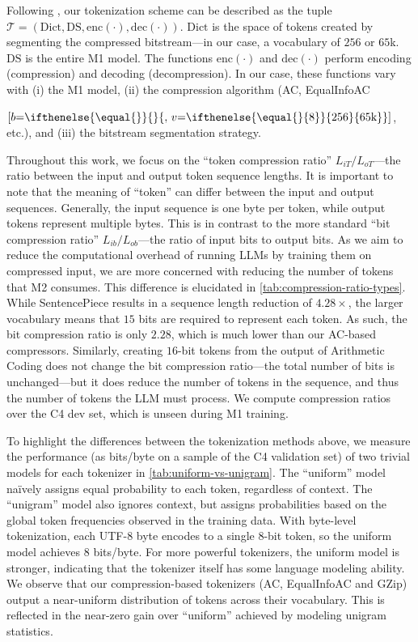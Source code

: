 Following \citet{rajaramanTowardTheoryTokenization2024}, our tokenization scheme can be described as the tuple $\mathcal{T} = (\mathrm{Dict}, \mathrm{DS}, \mathrm{enc}(\cdot), \mathrm{dec}(\cdot))$. $\mathrm{Dict}$ is the space of tokens created by segmenting the compressed bitstream---in our case, a vocabulary of $256$ or $65$k. $\mathrm{DS}$ is the entire M1 model. The functions $\mathrm{enc}(\cdot)$ and $\mathrm{dec}(\cdot)$ perform encoding (compression) and decoding (decompression). In our case, these functions vary with (i) the M1 model, (ii) the compression algorithm (AC{}, EqualInfoAC
\ifthenelse{
    \equal{} \AND \equal{}
  }

  {$[b\mathord{=}\ifthenelse{\equal{}}{}{,\,v\mathord{=}\ifthenelse{\equal{}{8}}{256}{65\text{k}}}]$}, etc.), and (iii) the bitstream segmentation strategy.

Throughout this work, we focus on the ``token compression ratio'' $L_{iT}/L_{oT}$---the ratio between the input and output token sequence lengths. It is important to note that the meaning of ``token'' can differ between the input and output sequences. Generally, the input sequence is one byte per token, while output tokens represent multiple bytes. This is in contrast to the more standard ``bit compression ratio'' $L_{ib}/L_{ob}$---the ratio of input bits to output bits. As we aim to reduce the computational overhead of running LLMs by training them on compressed input, we are more concerned with reducing the number of tokens that M2 consumes. This difference is elucidated in \ref{tab:compression-ratio-types}. While SentencePiece results in a sequence length reduction of $4.28\times$, the larger vocabulary means that $15$ bits are required to represent each token. As such, the bit compression ratio is only $2.28$, which is much lower than our AC-based compressors. Similarly, creating $16$-bit tokens from the output of Arithmetic Coding does not change the bit compression ratio---the total number of bits is unchanged---but it does reduce the number of tokens in the sequence, and thus the number of tokens the LLM must process. We compute compression ratios over the C4 dev set, which is unseen during M1 training.

To highlight the differences between the tokenization methods above, we measure the performance (as bits/byte on a sample of the C4 validation set) of two trivial models for each tokenizer in \ref{tab:uniform-vs-unigram}. The ``uniform'' model naïvely assigns equal probability to each token, regardless of context. The ``unigram'' model also ignores context, but assigns probabilities based on the global token frequencies observed in the training data. With byte-level tokenization, each UTF-8 byte encodes to a single $8$-bit token, so the uniform model achieves $8$ bits/byte. For more powerful tokenizers, the uniform model is stronger, indicating that the tokenizer itself has some language modeling ability. We observe that our compression-based tokenizers (AC, EqualInfoAC and GZip) output a near-uniform distribution of tokens across their vocabulary. This is reflected in the near-zero gain over ``uniform'' achieved by modeling unigram statistics.

